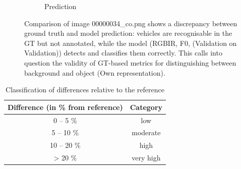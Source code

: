 \begin{figure}[h]
\begin{subfigure}[b]{0.45\textwidth}
        \caption{Prediction} %
        \label{fig:cm_irgb} %
    \end{subfigure}
    \caption[Comparison \acrshort{GT} and Prediction (RGBIR, F0, Validation on Validation Dataset) of image 00000034\_co.png]{Comparison of image 00000034\_co.png shows a discrepancy between ground truth and model prediction: vehicles are recognisable in the GT but not annotated, while the model (RGBIR, F0, (Validation on Validation)) detects and classifies them correctly. This calls into question the validity of GT-based metrics for distinguishing between background and object (Own representation).} %
    \label{fig:wrong_labels} %
\end{figure}


\begin{table}[h]
\centering
\begin{tabular}{c c}
\hline
\textbf{Difference (in \% from reference)} & \textbf{Category} \\ \hline
0 -- 5 \%   & low \\ 
5 -- 10 \%  & moderate \\ 
10 -- 20 \% & high \\ 
> 20 \%     & very high \\ \hline
\end{tabular}
\caption{Classification of differences relative to the reference}
\label{tab:diff_cat}
\end{table}


